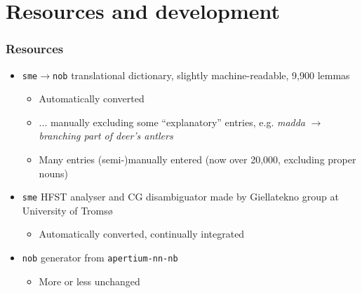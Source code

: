 \documentclass[notes=hide]{beamer}
\newcommand{\sme}{{\tt sme}}
\newcommand{\nob}{{\tt nob}}
\newcommand{\smenob}{\sme$\rightarrow{}$\nob}
\begin{document}
\section{Resources and development}
\begin{frame}
  \frametitle{Resources}
  \begin{itemize}
  \item \smenob{} translational dictionary, slightly machine-readable,
    9,900 lemmas
    \begin{itemize}
    \item Automatically converted
    \item ... manually excluding some
      ``explanatory'' entries, e.g. \textit{madda} $\rightarrow$
      \textit{branching part of deer's antlers}
    \item Many entries (semi-)manually entered (now over 20,000, excluding
      proper nouns)
    \end{itemize}
  \end{itemize}
  \begin{itemize}
  \item \sme{} HFST analyser and CG disambiguator made by Giellatekno group
    at University of Tromsø
    \begin{itemize}
    \item Automatically converted, continually integrated
    \end{itemize}
  \end{itemize}
  \begin{itemize}
  \item \nob{} generator from \texttt{apertium-nn-nb}
    \begin{itemize}
    \item More or less unchanged
    \end{itemize}
  \end{itemize}
\end{frame}
\end{document}

